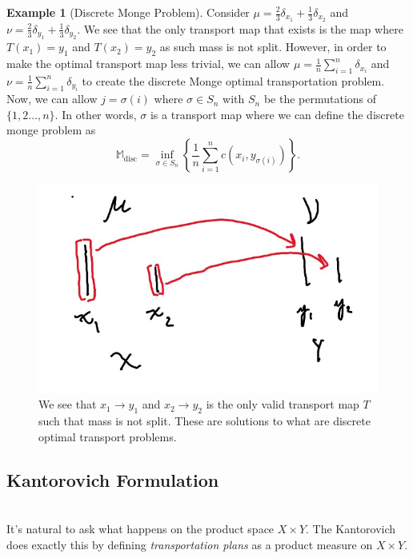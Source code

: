 \documentclass[psamsfonts]{amsart}
\theoremstyle{definition}
\newtheorem{exmp}{Example}[section]
\numberwithin{equation}{section}
\begin{document}
\begin{exmp}[Discrete Monge Problem]\label{exmp:monge}
Consider $\mu = \frac{2}{3}\delta_{x_1} + \frac{1}{3}\delta_{x_2}$ and $\nu = \frac{2}{3}\delta_{y_1} + \frac{1}{3}\delta_{y_2}$. We see that the only transport map that exists is the map where $T(x_1) = y_1$ and $T(x_2)=y_2$ as such mass is not split.
However, in order to make the optimal transport map less trivial, we can allow $\mu = \frac{1}{n}\sum_{i=1}^n\delta_{x_i}$ and $\nu = \frac{1}{n}\sum_{i=1}^n\delta_{y_i}$ to create the discrete Monge optimal transportation problem. \newline
Now, we can allow $j = \sigma(i)$ where $\sigma \in S_n$ with $S_n$ be the permutations of $\{1,2\dots,n\}$. In other words, $\sigma$ is a transport map where we can define the discrete monge problem as 
\[\mathbb{M}_{\text{disc}} = \inf_{\sigma\in S_n}\left\{\frac{1}{n}\sum_{i=1}^nc(x_i,y_{\sigma(i)})\right\}.\]
\begin{figure}[H]
  \includegraphics[scale=0.3]{monge.jpg}
  \caption{We see that $x_1\to y_1$ and $x_2\to y_2$ is the only valid transport map $T$ such that mass is not split. These are solutions to what are discrete optimal transport problems.}
  \label{fig:monge}
\end{figure}
\end{exmp}
\subsection{Kantorovich Formulation}\hfill\\

It's natural to ask what happens on the product space $X\times Y$. The Kantorovich does exactly this by defining \textit{transportation plans} as a product measure on $X\times Y$.
\end{document}
